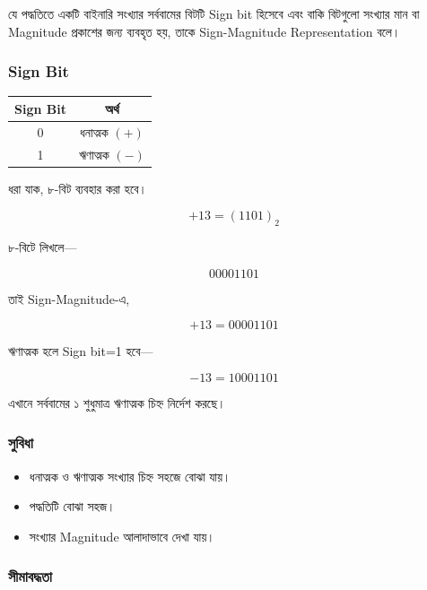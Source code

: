যে পদ্ধতিতে একটি বাইনারি সংখ্যার সর্ববামের বিটটি
\textenglish{Sign bit} হিসেবে এবং বাকি বিটগুলো সংখ্যার মান বা
\textenglish{Magnitude} প্রকাশের জন্য ব্যবহৃত হয়,
তাকে \textenglish{Sign-Magnitude Representation} বলে।
\par\endgroup


\subsubsection*{\textenglish{Sign Bit}}

\begin{center}
\begin{tabular}{|c|c|}
\hline
\rowcolor{ICTLightBlue}
\textbf{\textenglish{Sign Bit}} & \textbf{অর্থ} \\
\hline
0 & ধনাত্মক $(+)$ \\
\hline
1 & ঋণাত্মক $(-)$ \\
\hline
\end{tabular}
\end{center}

ধরা যাক, ৮-বিট ব্যবহার করা হবে।

\[
+13=(1101)_2
\]

৮-বিটে লিখলে—

\[
00001101
\]

তাই \textenglish{Sign-Magnitude}-এ,

\[
\boxed{+13=00001101}
\]

ঋণাত্মক হলে \textenglish{Sign bit}=1 হবে—

\[
\boxed{-13=10001101}
\]

এখানে সর্ববামের ১ শুধুমাত্র ঋণাত্মক চিহ্ন নির্দেশ করছে।

\subsubsection*{সুবিধা}

\begin{itemize}[label={{\bulletfont\textbullet}}, leftmargin=*, nosep]
    \item ধনাত্মক ও ঋণাত্মক সংখ্যার চিহ্ন সহজে বোঝা যায়।
    \item পদ্ধতিটি বোঝা সহজ।
    \item সংখ্যার \textenglish{Magnitude} আলাদাভাবে দেখা যায়।
\end{itemize}

\subsubsection*{সীমাবদ্ধতা}

